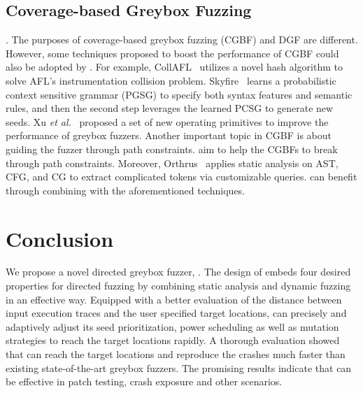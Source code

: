 \subsection{Coverage-based Greybox Fuzzing}.
The purposes of coverage-based greybox fuzzing (CGBF) and DGF are different. However, some techniques proposed to boost the performance of CGBF could also be adopted by \dFOT.
For example, CollAFL~\cite{CollAFL} utilizes a novel hash algorithm to solve AFL's instrumentation collision problem.
Skyfire~\cite{junjie:2017sp:skyfire} learns a probabilistic context sensitive grammar (PGSG) to specify both syntax features and semantic rules, and then the second step leverages the learned PCSG to generate new seeds.
Xu \textit{et al.}~\cite{XuKMK:2017} proposed a set of new operating primitives to improve the performance of greybox fuzzers.
Another important topic in CGBF is about guiding the fuzzer through path constraints. \cite{Stephens2016Driller, rawat:2017, LiCMLLT17, Angora, tfuzz} aim to help the CGBFs to break through path constraints.
Moreover, Orthrus~\cite{Shastry:LNCS2017:Orthrus} applies static analysis on AST, CFG, and CG to extract complicated tokens via customizable queries. 
\dFOT can benefit through combining with the aforementioned techniques.

%
 \section{Conclusion}
We propose a novel directed greybox fuzzer, \dFOT.
The design of \dFOT embeds four desired properties for directed fuzzing by combining static analysis and dynamic fuzzing in an effective way.
Equipped with a better evaluation of the distance between input execution traces and the user specified target locations, \dFOT can precisely and adaptively adjust its seed prioritization, power scheduling as well as mutation strategies to reach the target locations rapidly.
A thorough evaluation showed that \dFOT can reach the target locations and reproduce the crashes much faster than existing state-of-the-art greybox fuzzers.
The promising results indicate that \dFOT can be effective in patch testing, crash exposure and other scenarios. 